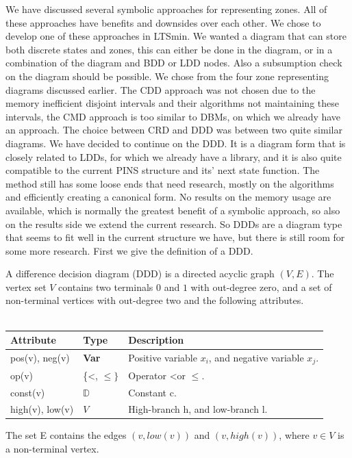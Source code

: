 We have discussed several symbolic approaches for representing zones. All of these approaches have benefits and downsides over each other. We chose to develop one of these approaches in LTSmin. We wanted a diagram that can store both discrete states and zones, this can either be done in the diagram, or in a combination of the diagram and BDD or LDD nodes. Also a subsumption check on the diagram should be possible. We chose from the four zone representing diagrams discussed earlier. The CDD approach was not chosen due to the memory inefficient disjoint intervals and their algorithms not maintaining these intervals, the CMD approach is too similar to DBMs, on which we already have an approach. The choice between CRD and DDD was between two quite similar diagrams. We have decided to continue on the DDD. It is a diagram form that is closely related to LDDs, for which we already have a library, and it is also quite compatible to the current PINS structure and its' next state function. The method still has some loose ends that need research, mostly on the algorithms and efficiently creating a canonical form. No results on the memory usage are available, which is normally the greatest benefit of a symbolic approach, so also on the results side we extend the current research. So DDDs are a diagram type that seems to fit well in the current structure we have, but there is still room for some more research. First we give the definition of a DDD.

\begin{mydef}
\label{def:DDD}
A difference decision diagram (DDD) is a directed acyclic graph $(V,E)$. The vertex set $V$ contains two terminals $0$ and $1$ with out-degree zero, and a set of non-terminal vertices with out-degree two and the following attributes.
\\\\
\begin{tabular}{lll}
Attribute                & Type                      & Description                                           \\\hline
pos(v), neg(v)           & \textbf{Var}              & Positive variable $x_i$, and negative variable $x_j$. \\
op(v)                    & \{\textless, $\leq\}$     & Operator \textless or $\leq$.                         \\
const(v)                 & $\mathbb{D}$              & Constant c.                                           \\
high(v), low(v)          & $V$                       & High-branch h, and low-branch l.                   
\end{tabular}
The set E contains the edges $(v,low(v))$ and $(v, high(v))$, where $v \in V$ is a non-terminal vertex.
\end{mydef}


